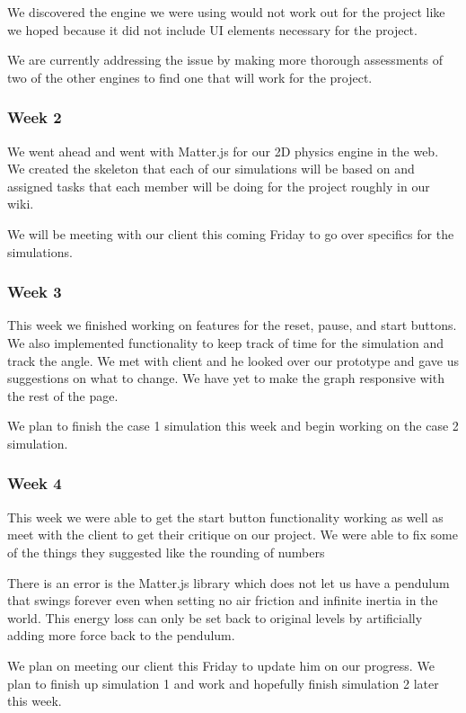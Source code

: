We discovered the engine we were using would not work out for the project like we hoped because it did not include UI elements necessary for the project. 

We are currently addressing the issue by making more thorough assessments of two of the other engines to find one that will work for the project.

\subsubsection{Week 2}
We went ahead and went with Matter.js for our 2D physics engine in the web. We created the skeleton that each of our simulations will be based on and assigned tasks that each member will be doing for the project roughly in our wiki.

We will be meeting with our client this coming Friday to go over specifics for the simulations.

\subsubsection{Week 3}
This week we finished working on features for the reset, pause, and start buttons. We also implemented functionality to keep track of time for the simulation and track the angle. We met with client and he looked over our prototype and gave us suggestions on what to change.
We have yet to make the graph responsive with the rest of the page.

We plan to finish the case 1 simulation this week and begin working on the case 2 simulation.

\subsubsection{Week 4}
This week we were able to get the start button functionality working as well as meet with the client to get their critique on our project. We were able to fix some of the things they suggested like the rounding of numbers

There is an error is the Matter.js library which does not let us have a pendulum that swings forever even when setting no air friction and infinite inertia in the world. This energy loss can only be set back to original levels by artificially adding more force back to the pendulum.

We plan on meeting our client this Friday to update him on our progress. We plan to finish up simulation 1 and work and hopefully finish simulation 2 later this week.


